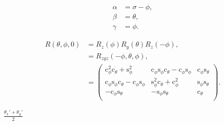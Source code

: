 \documentclass[a4paper,11pt,twoside,openright]{book}
\def\lthtmlcheckvsize{\ifdim\ht\sizebox<\vsize 
  \ifdim\wd\sizebox<\hsize\expandafter\hfill\fi \expandafter\vfill
  \else\expandafter\vss\fi}%
\begin{document}
{\newpage\clearpage
\setcounter{equation}{74}
%
\begin{subequations}\begin{align}
\alpha &= \sigma - \phi , \\
\beta  &= \theta , \\
\gamma &= \phi .
\end{align}\end{subequations}%
\lthtmldisplayZ
\lthtmlcheckvsize\clearpage}

{\newpage\clearpage
\setcounter{equation}{76}
%
\begin{subequations}\begin{align}
R(\theta, \phi, 0)
&= R_z(\phi)R_y(\theta)R_z(-\phi) , \\
&= R_{zyz}(-\phi, \theta, \phi) , \\
&= \begin{pmatrix}
\mathrm{c}^2_\phi \mathrm{c}_\theta + \mathrm{s}^2_\phi                                 & \mathrm{c}_\phi \mathrm{s}_\phi \mathrm{c}_\theta - \mathrm{c}_{\phi} \mathrm{s}_\phi & \mathrm{c}_\phi \mathrm{s}_\theta \\
\mathrm{c}_{\phi} \mathrm{s}_\phi \mathrm{c}_\theta - \mathrm{c}_\phi \mathrm{s}_{\phi} & \mathrm{s}^2_\phi \mathrm{c}_\theta + \mathrm{c}^2_\phi                               & \mathrm{s}_\phi \mathrm{s}_\theta \\
-\mathrm{c}_{\phi} \mathrm{s}_\theta                                                    & -\mathrm{s}_{\phi} \mathrm{s}_\theta                                                  & \mathrm{c}_\theta \\
\end{pmatrix} .\end{align}\end{subequations}%
\lthtmldisplayZ
\lthtmlcheckvsize\clearpage}

{\newpage\clearpage
{}%
$\displaystyle {\frac{{\theta_x ' + \theta_y '}}{{2}}}$%
\lthtmlindisplaymathZ
\lthtmlcheckvsize\clearpage}
\end{document}
